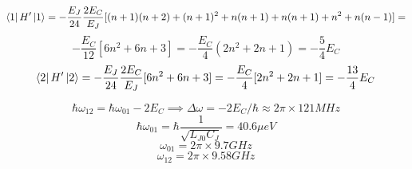 \documentclass{article}
\begin{document}
$$\bra{1}H'\ket{1} = -\frac{E_J}{24}\frac{2E_C}{E_J}[(n+1)(n+2) + (n+1)^2 + n(n+1) + n(n+1)+ n^2 + n(n-1)] = 
$$
$$-\frac{E_C}{12}[6n^2+6n+3] = -\frac{E_C}{4}(2n^2+2n+1) = -\frac{5}{4}E_C$$
$$\bra{2}H'\ket{2} = -\frac{E_J}{24}\frac{2E_C}{E_J}[6n^2+6n+3] = -\frac{E_C}{4}[2n^2+2n+1]=-\frac{13}{4}E_C$$

$$\hbar\omega_{12} = \hbar\omega_{01} -2E_C \implies \Delta\omega = -2E_C/\hbar \approx 2\pi \times 121 MHz $$
$$\hbar\omega_{01} = \hbar\frac{1}{\sqrt{L_{J0}C_J}} = 40.6\mu eV$$
$$\omega_{01} = 2\pi \times 9.7GHz$$
$$\omega_{12} = 2\pi \times 9.58GHz$$
\end{document}

